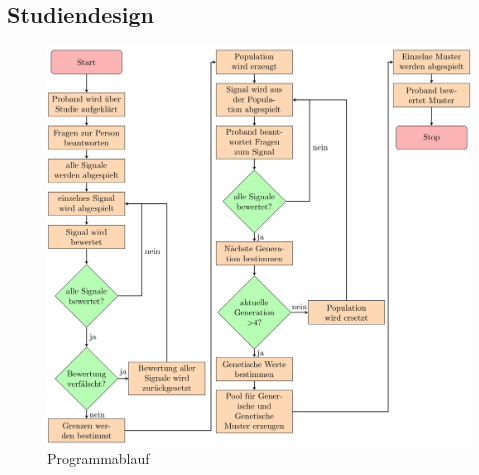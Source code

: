 

\subsection{Studiendesign}

\begin{figure}
	\centering
    \includegraphics[width=\textwidth]{pics/analyse/Programmablaufdiagramm.png}
    \caption{Programmablauf}
    \label{fig:flussdiagramm}
\end{figure}

